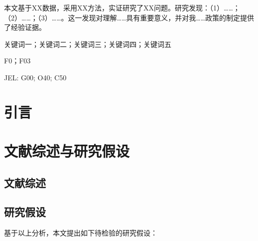 \documentclass[10.5pt, UTF8, twocolumn, landscape]{ctexart}
\begin{document}



\begin{jjYXabstract}
本文基于XX数据，采用XX方法，实证研究了XX问题。研究发现：（1）……；（2）……；（3）……。这一发现对理解……具有重要意义，并对我……政策的制定提供了经验证据。
\end{jjYXabstract}

\begin{jjYXkeywords}
关键词一；关键词二；关键词三；关键词四；关键词五
\end{jjYXkeywords}

\begin{jjYXclscode}
F0；F03
\end{jjYXclscode}

\begin{jjYXjel}
JEL: G00; O40; C50
\end{jjYXjel}


\section{引言}
\label{sec:intro}

\section{文献综述与研究假设}
\label{sec:lit}

\subsection{文献综述}

\subsection{研究假设}
基于以上分析，本文提出如下待检验的研究假设：
\end{document}
